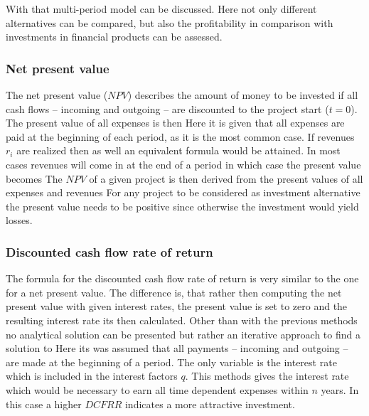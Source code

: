 With that multi-period model can be discussed. Here not only different alternatives can be compared, 
but also the profitability in comparison with investments in financial products can be assessed. 

\subsubsection{Net present value}
The net present value ($NPV$) describes the amount of money to be invested if all cash flows --
incoming and outgoing -- are discounted to the project start ($t = 0$). The present value of
all expenses is then 
%
Here it is given that all expenses are paid at the beginning of each period, as it is the most common case. 
If revenues $r_i$ are realized then as well an equivalent formula would be attained. In most cases 
revenues will come in at the end of a period in which case the present value becomes
%
The $NPV$ of a given project is then derived from the present values of all expenses and revenues
%
For any project to be considered as investment alternative the present value needs to be positive since 
otherwise the investment would yield losses. 

\subsubsection{Discounted cash flow rate of return}
The formula for the discounted cash flow rate of return is very similar to the one for a net present value. 
The difference is, that rather then computing the net present value with given interest rates, the present
value is set to zero and the resulting interest rate its then calculated. Other than with the previous methods 
no analytical solution can be presented but rather an iterative approach to find a solution to 
%
Here its was assumed that all payments -- incoming and outgoing -- are made at the beginning of a period. 
The only variable is the interest rate which is included in the interest factors $q$. This methods gives
the interest rate which would be necessary to earn all time dependent expenses within $n$ years. In this 
case a higher $DCFRR$ indicates a more attractive investment. 

